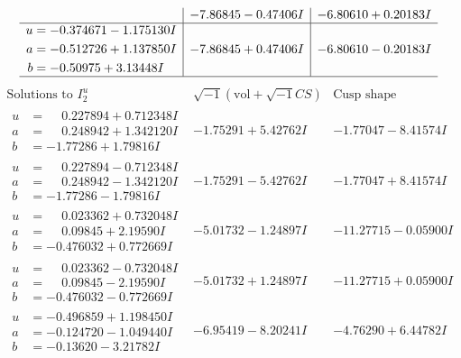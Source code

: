 \documentclass[1p]{elsarticle_modified}
\theoremstyle{definition}
\newcommand{\I}{\sqrt{-1}}
\begin{document}
$$\begin{array}{c|c|c}
 & -7.86845 - 0.47406 I & -6.80610 + 0.20183 I \\ \hline\begin{aligned}
u &= -0.374671 - 1.175130 I \\
a &= -0.512726 + 1.137850 I \\
b &= -0.50975 + 3.13448 I\end{aligned}
 & -7.86845 + 0.47406 I & -6.80610 - 0.20183 I\\
 \hline 
 \end{array}$$\newpage$$\begin{array}{c|c|c}  
\text{Solutions to }I^u_{2}& \I (\text{vol} + \sqrt{-1}CS) & \text{Cusp shape}\\
 \hline 
\begin{aligned}
u &= \phantom{-}0.227894 + 0.712348 I \\
a &= \phantom{-}0.248942 + 1.342120 I \\
b &= -1.77286 + 1.79816 I\end{aligned}
 & -1.75291 + 5.42762 I & -1.77047 - 8.41574 I \\ \hline\begin{aligned}
u &= \phantom{-}0.227894 - 0.712348 I \\
a &= \phantom{-}0.248942 - 1.342120 I \\
b &= -1.77286 - 1.79816 I\end{aligned}
 & -1.75291 - 5.42762 I & -1.77047 + 8.41574 I \\ \hline\begin{aligned}
u &= \phantom{-}0.023362 + 0.732048 I \\
a &= \phantom{-}0.09845 + 2.19590 I \\
b &= -0.476032 + 0.772669 I\end{aligned}
 & -5.01732 - 1.24897 I & -11.27715 - 0.05900 I \\ \hline\begin{aligned}
u &= \phantom{-}0.023362 - 0.732048 I \\
a &= \phantom{-}0.09845 - 2.19590 I \\
b &= -0.476032 - 0.772669 I\end{aligned}
 & -5.01732 + 1.24897 I & -11.27715 + 0.05900 I \\ \hline\begin{aligned}
u &= -0.496859 + 1.198450 I \\
a &= -0.124720 - 1.049440 I \\
b &= -0.13620 - 3.21782 I\end{aligned}
 & -6.95419 - 8.20241 I & -4.76290 + 6.44782 I \\ \hline\begin{aligned}

\end{aligned}
\end{array}$$
\end{document}
